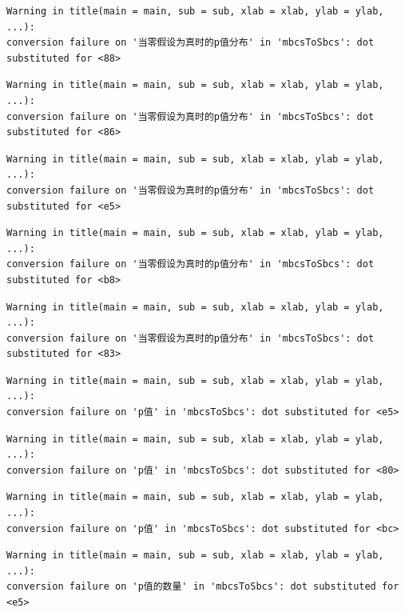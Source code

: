 \documentclass[
  letterpaper,
  DIV=11,
  numbers=noendperiod]{scrreprt}
\begin{document}
\begin{verbatim}
Warning in title(main = main, sub = sub, xlab = xlab, ylab = ylab, ...):
conversion failure on '当零假设为真时的p值分布' in 'mbcsToSbcs': dot
substituted for <88>
\end{verbatim}

\begin{verbatim}
Warning in title(main = main, sub = sub, xlab = xlab, ylab = ylab, ...):
conversion failure on '当零假设为真时的p值分布' in 'mbcsToSbcs': dot
substituted for <86>
\end{verbatim}

\begin{verbatim}
Warning in title(main = main, sub = sub, xlab = xlab, ylab = ylab, ...):
conversion failure on '当零假设为真时的p值分布' in 'mbcsToSbcs': dot
substituted for <e5>
\end{verbatim}

\begin{verbatim}
Warning in title(main = main, sub = sub, xlab = xlab, ylab = ylab, ...):
conversion failure on '当零假设为真时的p值分布' in 'mbcsToSbcs': dot
substituted for <b8>
\end{verbatim}

\begin{verbatim}
Warning in title(main = main, sub = sub, xlab = xlab, ylab = ylab, ...):
conversion failure on '当零假设为真时的p值分布' in 'mbcsToSbcs': dot
substituted for <83>
\end{verbatim}

\begin{verbatim}
Warning in title(main = main, sub = sub, xlab = xlab, ylab = ylab, ...):
conversion failure on 'p值' in 'mbcsToSbcs': dot substituted for <e5>
\end{verbatim}

\begin{verbatim}
Warning in title(main = main, sub = sub, xlab = xlab, ylab = ylab, ...):
conversion failure on 'p值' in 'mbcsToSbcs': dot substituted for <80>
\end{verbatim}

\begin{verbatim}
Warning in title(main = main, sub = sub, xlab = xlab, ylab = ylab, ...):
conversion failure on 'p值' in 'mbcsToSbcs': dot substituted for <bc>
\end{verbatim}

\begin{verbatim}
Warning in title(main = main, sub = sub, xlab = xlab, ylab = ylab, ...):
conversion failure on 'p值的数量' in 'mbcsToSbcs': dot substituted for <e5>
\end{verbatim}
\end{document}
